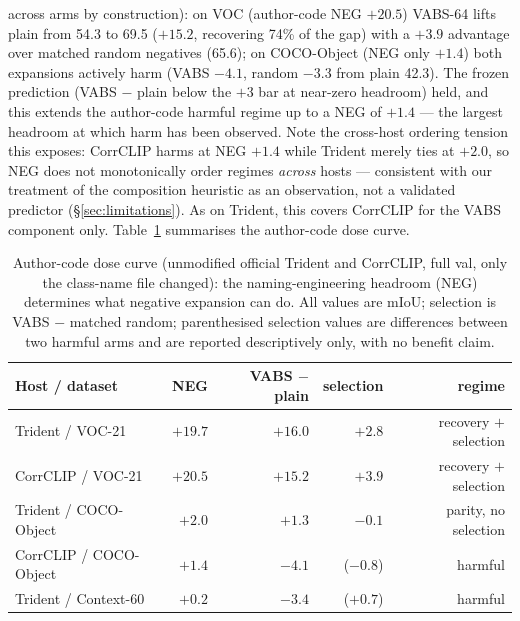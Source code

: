 \documentclass[11pt]{article}
\begin{document}
across arms by construction): on VOC (author-code NEG $+20.5$) VABS-64
lifts plain from 54.3 to 69.5 ($+15.2$, recovering 74\% of the gap) with a
$+3.9$ advantage over matched random negatives (65.6); on COCO-Object (NEG
only $+1.4$) both expansions actively harm (VABS $-4.1$, random $-3.3$
from plain 42.3). The frozen prediction (VABS $-$ plain below the $+3$ bar
at near-zero headroom) held, and this extends the author-code harmful
regime up to a NEG of $+1.4$ --- the largest headroom at which harm has
been observed. Note the cross-host ordering tension this exposes: CorrCLIP
harms at NEG $+1.4$ while Trident merely ties at $+2.0$, so NEG does not
monotonically order regimes \emph{across} hosts --- consistent with our
treatment of the composition heuristic as an observation, not a validated
predictor (\S\ref{sec:limitations}).
As on Trident, this covers CorrCLIP for the VABS component only.
Table~\ref{tab:dosecurve} summarises the author-code dose
curve.

\begin{table}[t]
\centering
\small
\caption{Author-code dose curve (unmodified official Trident and CorrCLIP,
full val, only the class-name file changed): the naming-engineering
headroom (NEG) determines what negative expansion can do. All values are
mIoU; selection is VABS $-$ matched random; parenthesised selection values
are differences between two harmful arms and are reported descriptively
only, with no benefit claim.}
\label{tab:dosecurve}
\begin{tabular}{lrrrr}
\toprule
Host / dataset & NEG & VABS $-$ plain & selection & regime \\
\midrule
Trident / VOC-21 & $+19.7$ & $+16.0$ & $+2.8$ & recovery $+$ selection \\
CorrCLIP / VOC-21 & $+20.5$ & $+15.2$ & $+3.9$ & recovery $+$ selection \\
Trident / COCO-Object & $+2.0$ & $+1.3$ & $-0.1$ & parity, no selection \\
CorrCLIP / COCO-Object & $+1.4$ & $-4.1$ & ($-0.8$) & harmful \\
Trident / Context-60 & $+0.2$ & $-3.4$ & ($+0.7$) & harmful \\
\bottomrule
\end{tabular}
\end{table}
\end{document}
